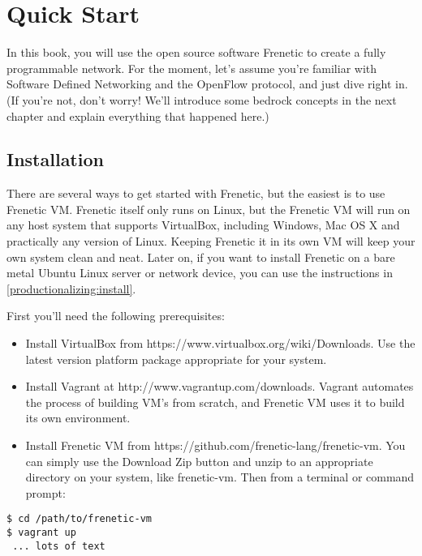 
\chapter{Quick Start}

In this book, you will use the open source software Frenetic to create a fully programmable network.  
For the moment, let's assume you're familiar with Software Defined Networking and the OpenFlow protocol, 
and just dive right in.  (If you're not, don't worry!  
We'll introduce some bedrock concepts in the next chapter and explain everything that happened here.)  

\section{Installation}

There are several ways to get started with Frenetic, but the easiest is to use Frenetic VM.  
Frenetic itself only runs on Linux, but the Frenetic VM will run on any host system that supports 
VirtualBox, including Windows, Mac OS X and practically any version of Linux.   
Keeping Frenetic it in its own VM will keep your own system clean and neat.  
Later on, if you want to install Frenetic on a bare metal Ubuntu Linux server or network device, 
you can use the instructions in \ref{productionalizing:install}. 

First you'll need the following prerequisites: 

\begin{itemize}
\item Install VirtualBox from https://www.virtualbox.org/wiki/Downloads.  Use the latest version platform package appropriate for your system.  
\item Install Vagrant at http://www.vagrantup.com/downloads.  Vagrant automates the process of building VM's from scratch, and Frenetic VM uses it to build its own environment.  
\item Install Frenetic VM from https://github.com/frenetic-lang/frenetic-vm.  You can simply use the Download Zip button and unzip to an appropriate directory on your system, like frenetic-vm.  Then from a terminal or command prompt:
\end{itemize}

\begin{verbatim}
$ cd /path/to/frenetic-vm
$ vagrant up
 ... lots of text 
\end{verbatim}

